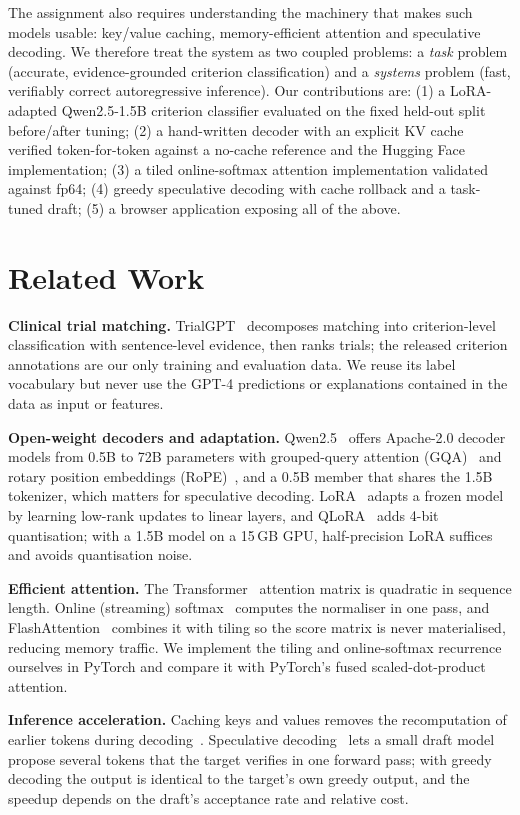 \documentclass[conference]{IEEEtran}
\begin{document}
The assignment also requires understanding the machinery that makes such models usable: key/value caching, memory-efficient attention and speculative decoding. We therefore treat the system as two coupled problems: a \emph{task} problem (accurate, evidence-grounded criterion classification) and a \emph{systems} problem (fast, verifiably correct autoregressive inference). Our contributions are: (1) a LoRA-adapted Qwen2.5-1.5B criterion classifier evaluated on the fixed held-out split before/after tuning; (2) a hand-written decoder with an explicit KV cache verified token-for-token against a no-cache reference and the Hugging Face implementation; (3) a tiled online-softmax attention implementation validated against fp64; (4) greedy speculative decoding with cache rollback and a task-tuned draft; (5) a browser application exposing all of the above.

\section{Related Work}
\textbf{Clinical trial matching.} TrialGPT~\cite{trialgpt} decomposes matching into criterion-level classification with sentence-level evidence, then ranks trials; the released criterion annotations are our only training and evaluation data. We reuse its label vocabulary but never use the GPT-4 predictions or explanations contained in the data as input or features.

\textbf{Open-weight decoders and adaptation.} Qwen2.5~\cite{qwen25} offers Apache-2.0 decoder models from 0.5B to 72B parameters with grouped-query attention (GQA)~\cite{gqa} and rotary position embeddings (RoPE)~\cite{rope}, and a 0.5B member that shares the 1.5B tokenizer, which matters for speculative decoding. LoRA~\cite{lora} adapts a frozen model by learning low-rank updates to linear layers, and QLoRA~\cite{qlora} adds 4-bit quantisation; with a 1.5B model on a 15\,GB GPU, half-precision LoRA suffices and avoids quantisation noise.

\textbf{Efficient attention.} The Transformer~\cite{transformer} attention matrix is quadratic in sequence length. Online (streaming) softmax~\cite{online} computes the normaliser in one pass, and FlashAttention~\cite{flash} combines it with tiling so the score matrix is never materialised, reducing memory traffic. We implement the tiling and online-softmax recurrence ourselves in PyTorch and compare it with PyTorch's fused scaled-dot-product attention.

\textbf{Inference acceleration.} Caching keys and values removes the recomputation of earlier tokens during decoding~\cite{pope}. Speculative decoding~\cite{specdec,specsamp} lets a small draft model propose several tokens that the target verifies in one forward pass; with greedy decoding the output is identical to the target's own greedy output, and the speedup depends on the draft's acceptance rate and relative cost.
\end{document}
